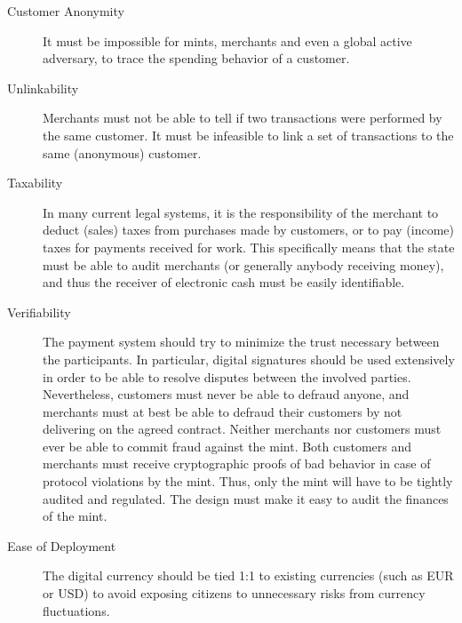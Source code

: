 \documentclass{llncs}
\begin{document}
\begin{description}
  \item[Customer Anonymity] It must be impossible for mints, merchants
    and even a global active adversary, to trace the spending behavior
    of a customer.
  \item[Unlinkability] Merchants must not be able to tell if two
    transactions were performed by the same customer.  It must be
    infeasible to link a set of transactions to the same (anonymous)
    customer. %
  \item[Taxability] In many current legal systems, it is the
    responsibility of the merchant to deduct (sales) taxes from
    purchases made by customers, or to pay (income) taxes for payments
    received for work.
    This specifically means that the state must be able to audit merchants (or
    generally anybody receiving money), and thus the receiver of
    electronic cash must be easily identifiable.
  \item[Verifiability] The payment system should try to minimize the
    trust necessary between the participants.  In particular, digital
    signatures should be used extensively in order to be able to
    resolve disputes between the involved parties.  Nevertheless,
    customers must never be able to defraud anyone, and merchants must
    at best be able to defraud their customers by not delivering
    on the agreed contract.  Neither merchants nor customers must ever
    be able to commit fraud against the mint.  Both customers and
    merchants must receive cryptographic proofs of bad behavior in
    case of protocol violations by the mint.  Thus, only the mint will
    have to be tightly audited and regulated.  The design must make it
    easy to audit the finances of the mint.
  \item[Ease of Deployment] %
    The digital currency should be
    tied 1:1 to existing currencies (such as EUR or USD) to avoid
    exposing citizens to unnecessary risks from currency fluctuations.

\end{description}
\end{document}
